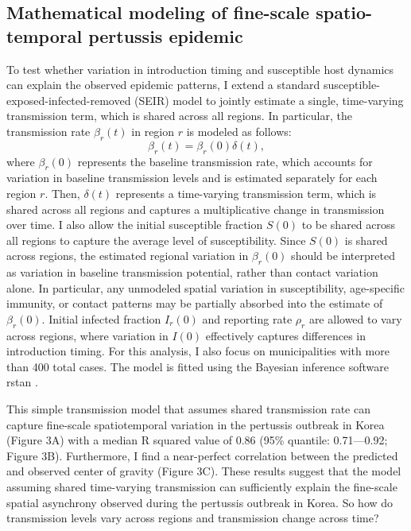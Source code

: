 \documentclass[12pt]{article}
\begin{document}
\subsection*{Mathematical modeling of fine-scale spatio-temporal pertussis epidemic}

To test whether variation in introduction timing and susceptible host dynamics can explain the observed epidemic patterns, I extend a standard susceptible-exposed-infected-removed (SEIR) model \citep{rohani2010contact} to jointly estimate a single, time-varying transmission term, which is shared across all regions.
In particular, the transmission rate $\beta_r(t)$ in region $r$ is modeled as follows:
\begin{equation}
\beta_r(t) = \beta_r(0) \delta(t),
\end{equation}
where $\beta_r(0)$ represents the baseline transmission rate, which accounts for variation in baseline transmission levels and is estimated separately for each region $r$.
Then, $\delta(t)$ represents a time-varying transmission term, which is shared across all regions and captures a multiplicative change in transmission over time.
I also allow the initial susceptible fraction $S(0)$ to be shared across all regions to capture the average level of susceptibility.
Since $S(0)$ is shared across regions, the estimated regional variation in $\beta_r(0)$ should be interpreted as variation in baseline transmission potential, rather than contact variation alone.
In particular, any unmodeled spatial variation in susceptibility, age-specific immunity, or contact patterns may be partially absorbed into the estimate of $\beta_r(0)$.
Initial infected fraction $I_r(0)$ and reporting rate $\rho_r$ are allowed to vary across regions, where variation in $I(0)$ effectively captures differences in introduction timing.
For this analysis, I also focus on municipalities with more than 400 total cases.
The model is fitted using the Bayesian inference software rstan \citep{carpenter2017stan}.

This simple transmission model that assumes shared transmission rate can capture fine-scale spatiotemporal variation in the pertussis outbreak in Korea (Figure 3A) with a median R squared value of 0.86 (95\% quantile: 0.71---0.92; Figure 3B).
Furthermore, I find a near-perfect correlation between the predicted and observed center of gravity (Figure 3C).
These results suggest that the model assuming shared time-varying transmission can sufficiently explain the fine-scale spatial asynchrony observed during the pertussis outbreak in Korea.
So how do transmission levels vary across regions and transmission change across time?
\end{document}
